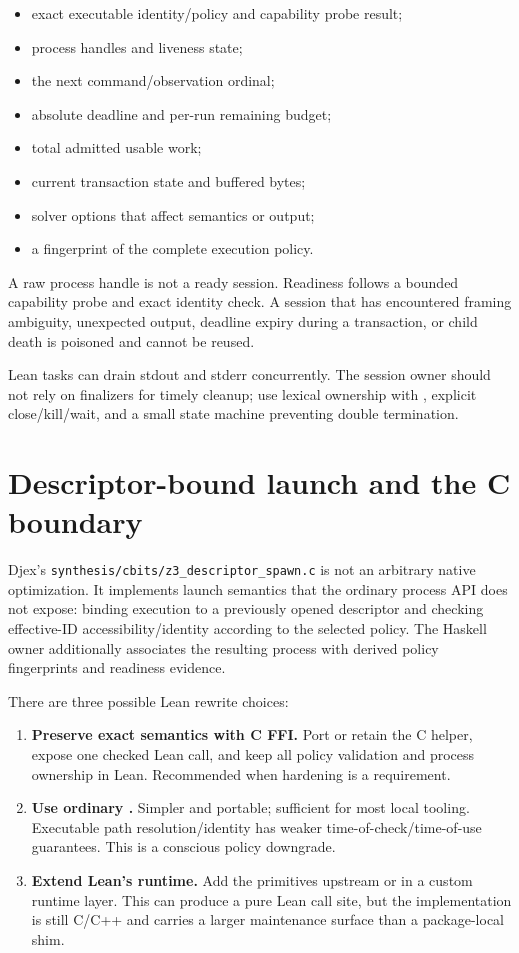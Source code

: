 \documentclass[10pt,letterpaper,oneside]{report}
\newcommand{\code}[1]{\texttt{\detokenize{#1}}}
\newcommand{\filepath}[1]{\nolinkurl{#1}}
\newcommand{\term}[1]{\textbf{#1}}
\begin{document}
\begin{itemize}
  \item exact executable identity/policy and capability probe result;
  \item process handles and liveness state;
  \item the next command/observation ordinal;
  \item absolute deadline and per-run remaining budget;
  \item total admitted usable work;
  \item current transaction state and buffered bytes;
  \item solver options that affect semantics or output;
  \item a fingerprint of the complete execution policy.
\end{itemize}

A raw process handle is not a ready session. Readiness follows a bounded capability probe and exact identity check. A session that has encountered framing ambiguity, unexpected output, deadline expiry during a transaction, or child death is poisoned and cannot be reused.

Lean tasks can drain stdout and stderr concurrently. The session owner should not rely on finalizers for timely cleanup; use lexical ownership with \code{try/finally}, explicit close/kill/wait, and a small state machine preventing double termination.

\section{Descriptor-bound launch and the C boundary}

Djex's \filepath{synthesis/cbits/z3_descriptor_spawn.c} is not an arbitrary native optimization. It implements launch semantics that the ordinary process API does not expose: binding execution to a previously opened descriptor and checking effective-ID accessibility/identity according to the selected policy. The Haskell owner additionally associates the resulting process with derived policy fingerprints and readiness evidence.

There are three possible Lean rewrite choices:

\begin{enumerate}
  \item \term{Preserve exact semantics with C FFI.} Port or retain the C helper, expose one checked Lean call, and keep all policy validation and process ownership in Lean. Recommended when hardening is a requirement.
  \item \term{Use ordinary \code{IO.Process.spawn}.} Simpler and portable; sufficient for most local tooling. Executable path resolution/identity has weaker time-of-check/time-of-use guarantees. This is a conscious policy downgrade.
  \item \term{Extend Lean's runtime.} Add the primitives upstream or in a custom runtime layer. This can produce a pure Lean call site, but the implementation is still C/C++ and carries a larger maintenance surface than a package-local shim.
\end{enumerate}
\end{document}
